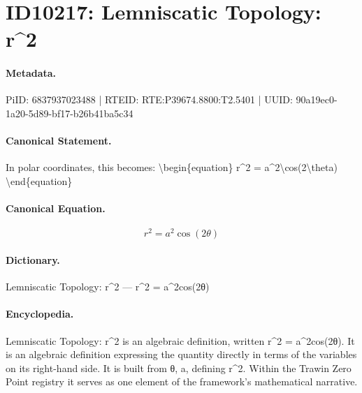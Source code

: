 \section*{ID10217: Lemniscatic Topology: r\textasciicircum{}2}
\paragraph{Metadata.}
PiID: 6837937023488 | RTEID: RTE:P39674.8800:T2.5401 | UUID: 90a19ec0-1a20-5d89-bf17-b26b41ba5c34

\paragraph{Canonical Statement.}
In polar coordinates, this becomes: \textbackslash{}begin\{equation\} r\textasciicircum{}2 = a\textasciicircum{}2\textbackslash{}cos(2\textbackslash{}theta) \textbackslash{}end\{equation\}

\paragraph{Canonical Equation.}
\[
r^2 = a^2\cos(2\theta)
\]

\paragraph{Dictionary.}
Lemniscatic Topology: r\textasciicircum{}2 — r\textasciicircum{}2 = a\textasciicircum{}2cos(2θ)

\paragraph{Encyclopedia.}
Lemniscatic Topology: r\textasciicircum{}2 is an algebraic definition, written r\textasciicircum{}2 = a\textasciicircum{}2cos(2θ). It is an algebraic definition expressing the quantity directly in terms of the variables on its right-hand side. It is built from θ, a, defining r\textasciicircum{}2. Within the Trawin Zero Point registry it serves as one element of the framework's mathematical narrative.
